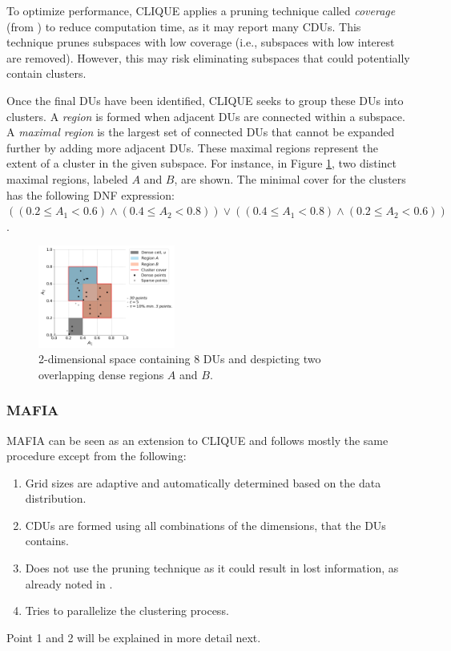 To optimize performance, CLIQUE applies a pruning technique called \textit{coverage} (from \cite{clique}) to reduce computation time, as it may report many CDUs. This technique prunes subspaces with low coverage (i.e., subspaces with low interest are removed). However, this may risk eliminating subspaces that could potentially contain clusters.

Once the final DUs have been identified, CLIQUE seeks to group these DUs into clusters. A \textit{region} is formed when adjacent DUs are connected within a subspace. A \textit{maximal region} is the largest set of connected DUs that cannot be expanded further by adding more adjacent DUs. These maximal regions represent the extent of a cluster in the given subspace. For instance, in Figure \ref{fig:dense_cells_and_regions}, two distinct maximal regions, labeled $A$ and $B$, are shown. The minimal cover for the clusters has the following DNF expression: $((0.2 \leq A_1 < 0.6) \land (0.4 \leq A_2 < 0.8)) \lor ((0.4 \leq A_1 < 0.8) \land (0.2 \leq A_2 < 0.6))$.
\begin{figure}[H]
    \vspace*{-0.5cm}
    \centering
    \includegraphics[width=0.4\textwidth]{figures/dense_cells_and_regions.png}
    \caption{2-dimensional space containing 8 DUs and despicting two overlapping dense regions $A$ and $B$.}
    \label{fig:dense_cells_and_regions}
    \vspace*{-0.5cm}
\end{figure}

\subsubsection{MAFIA}
MAFIA can be seen as an extension to CLIQUE and follows mostly the same procedure except from the following:
\begin{enumerate}
    \item Grid sizes are adaptive and automatically determined based on the data distribution.
    \item CDUs are formed using all combinations of the dimensions, that the DUs contains.
    \item Does not use the pruning technique as it could result in lost information, as already noted in \cite{clique}.
    \item Tries to parallelize the clustering process.
\end{enumerate}
Point 1 and 2 will be explained in more detail next.

